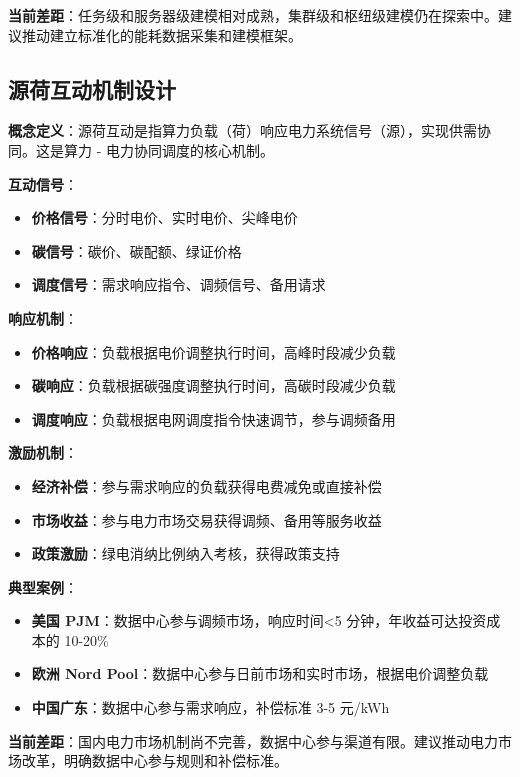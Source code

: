 \documentclass[12pt,a4paper]{article}
\begin{document}
\textbf{当前差距}：任务级和服务器级建模相对成熟，集群级和枢纽级建模仍在探索中。建议推动建立标准化的能耗数据采集和建模框架。

\subsection{源荷互动机制设计}

\textbf{概念定义}：源荷互动是指算力负载（荷）响应电力系统信号（源），实现供需协同。这是算力 - 电力协同调度的核心机制\cite{iea2023data}。

\textbf{互动信号}：
\begin{itemize}
    \item \textbf{价格信号}：分时电价、实时电价、尖峰电价
    \item \textbf{碳信号}：碳价、碳配额、绿证价格
    \item \textbf{调度信号}：需求响应指令、调频信号、备用请求
\end{itemize}

\textbf{响应机制}：
\begin{itemize}
    \item \textbf{价格响应}：负载根据电价调整执行时间，高峰时段减少负载
    \item \textbf{碳响应}：负载根据碳强度调整执行时间，高碳时段减少负载
    \item \textbf{调度响应}：负载根据电网调度指令快速调节，参与调频备用
\end{itemize}

\textbf{激励机制}：
\begin{itemize}
    \item \textbf{经济补偿}：参与需求响应的负载获得电费减免或直接补偿
    \item \textbf{市场收益}：参与电力市场交易获得调频、备用等服务收益
    \item \textbf{政策激励}：绿电消纳比例纳入考核，获得政策支持
\end{itemize}

\textbf{典型案例}：
\begin{itemize}
    \item \textbf{美国 PJM}：数据中心参与调频市场，响应时间<5 分钟，年收益可达投资成本的 10-20\%
    \item \textbf{欧洲 Nord Pool}：数据中心参与日前市场和实时市场，根据电价调整负载
    \item \textbf{中国广东}：数据中心参与需求响应，补偿标准 3-5 元/kWh
\end{itemize}

\textbf{当前差距}：国内电力市场机制尚不完善，数据中心参与渠道有限。建议推动电力市场改革，明确数据中心参与规则和补偿标准。
\end{document}
